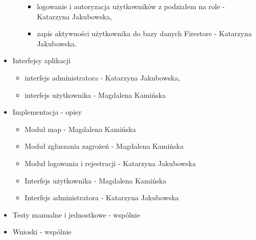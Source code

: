 \begin{itemize}
\begin{itemize}[label=$\circ$]
\begin{itemize}
                \item logowanie i autoryzacja użytkowników z podziałem na role - Katarzyna Jakubowska,
                \item zapis aktywności użytkownika do bazy danych Firestore - Katarzyna Jakubowska.
            \end{itemize}
        \end{itemize}
        \item Interfejsy aplikacji
        \begin{itemize}[label=$\circ$]
            \item interfejs administratora - Katarzyna Jakubowska,
            \item interfejs użytkownika - Magdalena Kamińska
        \end{itemize}
        \item Implementacja - opisy
        \begin{itemize}
            \item Moduł map - Magdalena Kamińska
            \item Moduł zgłaszania zagrożeń - Magdalena Kamińska
            \item Moduł logowania i rejestracji - Katarzyna Jakubowska
            \item Interfejs użytkownika - Magdalena Kamińska
            \item Interfejs administratora - Katarzyna Jakubowska
        \end{itemize}
        \item Testy manualne i jednostkowe - wspólnie
        \item Wnioski - wspólnie
        \end{itemize}
   

    \newpage